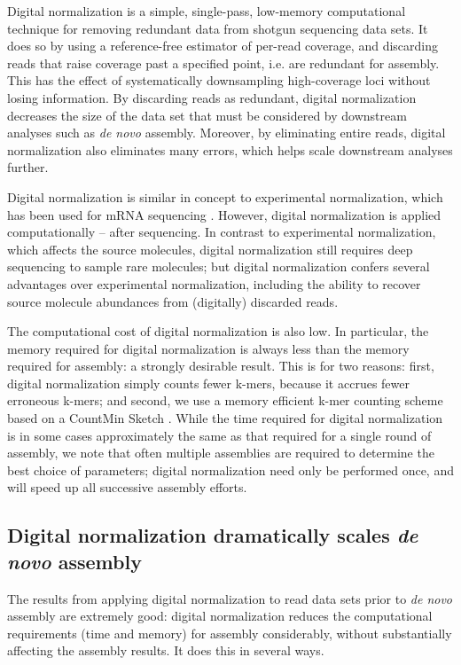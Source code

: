\documentclass[10pt]{article}
\begin{document}
Digital normalization is a simple, single-pass, low-memory
computational technique for removing redundant data from shotgun
sequencing data sets.  It does so by using a reference-free estimator
of per-read coverage, and discarding reads that raise coverage past a
specified point, i.e. are redundant for assembly.  This has the effect
of systematically downsampling high-coverage loci
without losing information.  By discarding reads as redundant,
digital normalization decreases the size of the data set that must be
considered by downstream analyses such as {\em de novo} assembly.
Moreover, by eliminating entire reads, digital normalization also
eliminates many errors, which helps scale downstream analyses further.

Digital normalization is similar in concept to experimental
normalization, which has been used for mRNA sequencing
\cite{pubmed8889548,pubmed7937745}. However, digital normalization is
applied computationally -- after sequencing.  In contrast to
experimental normalization, which affects the source molecules, digital
normalization still requires deep sequencing to sample rare molecules;
but digital normalization confers several advantages over experimental
normalization, including the ability to recover source molecule
abundances from (digitally) discarded reads.

The computational cost of digital normalization is also low.  In
particular, the memory required for digital normalization is always
less than the memory required for assembly: a strongly desirable
result.  This is for two reasons: first, digital normalization simply
counts fewer k-mers, because it accrues fewer erroneous k-mers; and
second, we use a memory efficient k-mer counting scheme based on a
CountMin Sketch \cite{countminsketch}.  While the time required for
digital normalization is in some cases approximately the same as that
required for a single round of assembly, we note that often multiple
assemblies are required to determine the best choice of parameters;
digital normalization need only be performed once, and will speed up
all successive assembly efforts.

\subsection*{Digital normalization dramatically scales {\em de novo} assembly}

The results from applying digital normalization to read data sets
prior to {\em de novo} assembly are extremely good: digital normalization
reduces the computational requirements (time and memory) for assembly
considerably, without substantially affecting the assembly results.
It does this in several ways.
\end{document}
